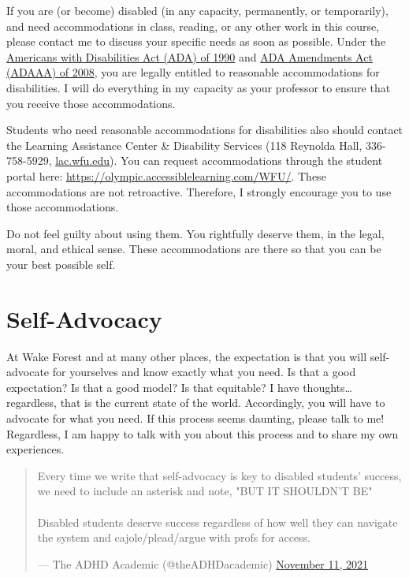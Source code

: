 If you are (or become) disabled (in any capacity, permanently, or temporarily), and need accommodations in class, reading, or any other work in this course, please contact me to discuss your specific needs as soon as possible.
Under the \href{https://beta.ada.gov/}{Americans with Disabilities Act (ADA) of 1990} and \href{https://en.wikipedia.org/wiki/ADA_Amendments_Act_of_2008}{ADA Amendments Act (ADAAA) of 2008}, you are legally entitled to reasonable accommodations for disabilities.
I will do everything in my capacity as your professor to ensure that you receive those accommodations.

Students who need reasonable accommodations for disabilities also should contact the Learning Assistance Center \& Disability Services (118 Reynolda Hall, 336-758-5929, \href{https://lac.wfu.edu/}{lac.wfu.edu}). You can request accommodations through the student portal here: \url{https://olympic.accessiblelearning.com/WFU/}. These accommodations are not retroactive. Therefore, I strongly encourage you to use those accommodations.

Do not feel guilty about using them.
You rightfully deserve them, in the legal, moral, and ethical sense.
These accommodations are there so that you can be your best possible self.

\hypertarget{self-advocacy}{%
\section{Self-Advocacy}\label{self-advocacy}}

At Wake Forest and at many other places, the expectation is that you will self-advocate for yourselves and know exactly what you need. Is that a good expectation? Is that a good model? Is that equitable? I have thoughts\ldots{} regardless, that is the current state of the world. Accordingly, you will have to advocate for what you need. If this process seems daunting, please talk to me! Regardless, I am happy to talk with you about this process and to share my own experiences.

\begin{quote}
Every time we write that self-advocacy is key to disabled students'
success, we need to include an asterisk and note, "BUT IT SHOULDN'T
BE"\\
~\\
Disabled students deserve success regardless of how well they can
navigate the system and cajole/plead/argue with profs for access.

\begin{flushright}--- The ADHD Academic (@theADHDacademic) \href{https://twitter.com/theADHDacademic/status/1458876178580881410}{November 11,
2021}\end{flushright}
\end{quote}

